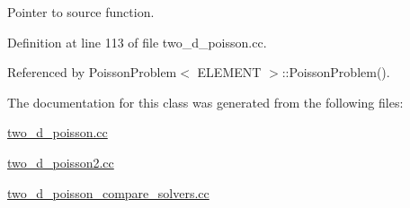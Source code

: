 Pointer to source function. 



Definition at line 113 of file two\+\_\+d\+\_\+poisson.\+cc.



Referenced by Poisson\+Problem$<$ E\+L\+E\+M\+E\+N\+T $>$\+::\+Poisson\+Problem().



The documentation for this class was generated from the following files\+:\begin{DoxyCompactItemize}
\item 
\hyperlink{two__d__poisson_8cc}{two\+\_\+d\+\_\+poisson.\+cc}\item 
\hyperlink{two__d__poisson2_8cc}{two\+\_\+d\+\_\+poisson2.\+cc}\item 
\hyperlink{two__d__poisson__compare__solvers_8cc}{two\+\_\+d\+\_\+poisson\+\_\+compare\+\_\+solvers.\+cc}\end{DoxyCompactItemize}

